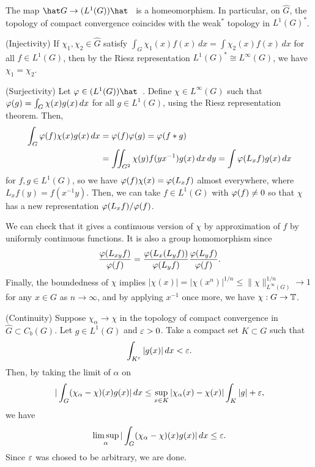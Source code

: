 \documentclass{../../small}
\begin{document}
\begin{prop}
The map $\hat G\to(L^1(G))\hat\enspace$ is a homeomorphism.
In particular, on $\hat G$, the topology of compact convergence coincides with the weak$^*$ topology in $L^1(G)^*$.
\end{prop}
\begin{pf}
(Injectivity)
If $\chi_1,\chi_2\in\hat G$ satisfy $\int_G\chi_1(x)f(x)\,dx=\int\chi_2(x)f(x)\,dx$ for all $f\in L^1(G)$, then by the Riesz representation $L^1(G)^*\cong L^\infty(G)$, we have $\chi_1=\chi_2$.


(Surjectivity)
Let $\f\in(L^1(G))\hat\enspace$.
Define $\chi\in L^\infty(G)$ such that $\varphi(g)=\int_G\chi(x)g(x)\,dx$ for all $g\in L^1(G)$, using the Riesz representation theorem.
Then,
\begin{align*}
\int_G\varphi(f)\chi(x)g(x)\,dx&=\varphi(f)\varphi(g)=\varphi(f*g)\\
&=\iint_{G^2}\chi(y)f(yx^{-1})g(x)\,dx\,dy=\int\varphi(L_xf)g(x)\,dx
\end{align*}
for $f,g\in L^1(G)$, so we have $\varphi(f)\chi(x)=\varphi(L_xf)$ almost everywhere, where $L_xf(y)=f(x^{-1}y)$.
Then, we can take $f\in L^1(G)$ with $\varphi(f)\ne0$ so that $\chi$ has a new representation $\varphi(L_xf)/\varphi(f)$.

We can check that it gives a continuous version of $\chi$ by approximation of $f$ by uniformly continuous functions.
It is also a group homomorphism since
\[\frac{\varphi(L_{xy}f)}{\varphi(f)}=\frac{\varphi(L_x(L_yf))}{\varphi(L_yf)}\frac{\varphi(L_yf)}{\varphi(f)}.\]
Finally, the boundedness of $\chi$ implies $|\chi(x)|=|\chi(x^n)|^{1/n}\le\|\chi\|_{L^\infty(G)}^{1/n}\to1$ for any $x\in G$ as $n\to\infty$, and by applying $x^{-1}$ once more, we have $\chi:G\to\mathbb{T}$.

(Continuity)
Suppose $\chi_\alpha\to\chi$ in the topology of compact convergence in $\hat G\subset C_b(G)$.
Let $g\in L^1(G)$ and $\varepsilon>0$.
Take a compact set $K\subset G$ such that
\[\int_{K^c}|g(x)|\,dx<\varepsilon.\]
Then, by taking the limit of $\alpha$ on
\[|\int_G(\chi_\alpha-\chi)(x)g(x)|\,dx\le\sup_{x\in K}|\chi_\alpha(x)-\chi(x)|\int_K|g|+\varepsilon,\]
we have
\[\limsup_\alpha|\int_G(\chi_\alpha-\chi)(x)g(x)|\,dx\le\varepsilon.\]
Since $\varepsilon$ was chosed to be arbitrary, we are done.


\end{pf}
\end{document}
